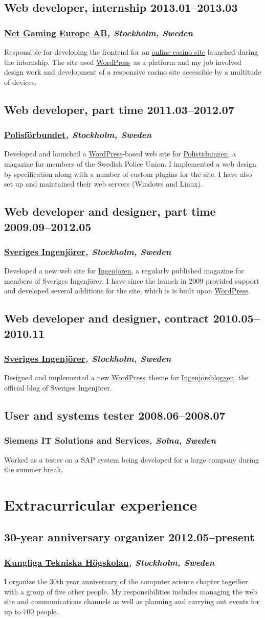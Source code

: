 \documentclass[a4paper,11pt]{article}
\newcommand{\thework}[2]{
  \subsection*{\textbf{#1} \hfill \textbf{#2}}\par%
}
\newcommand{\theplace}[2][]{%
  \subsubsection*{\textbf{#2}\textsl{#1}}%
}
\def\wordpress{\href{http://wordpress.org}{WordPress}}
\begin{document}
\thework{Web developer, internship}{2013.01--2013.03}
\theplace[, Stockholm, Sweden]{\href{http://www.netgaming.se}{Net Gaming Europe AB}}
Responsible for developing the frontend for an \href{http://casinoloco.com}{online casino site} launched during the internship. The site used \wordpress\ as a platform and my job involved design work and development of a responsive casino site accessible by a multitude of devices.

\thework{Web developer, part time}{2011.03--2012.07}
\theplace[, Stockholm, Sweden]{\href{http://www.polisforbundet.se}{Polisförbundet}}
Developed and launched a \wordpress-based web site for \href{http://www.polistidningen.se}{Polistidningen}, a magazine for members of the \mbox{Swedish} Police Union. I implemented a web design by specification along with a number of custom plugins for the site. I have also set up and maintained their web servers (Windows and Linux).

\thework{Web developer and designer, part time}{2009.09--2012.05}
\theplace[, Stockholm, Sweden]{\href{http://www.sverigesingenjorer.se}{Sveriges Ingenjörer}}
Developed a new web site for \href{http://www.ingenjoren.se}{Ingenjören}, a regularly published magazine for members of Sveriges Ingenjörer. I have since the launch in 2009 provided support and developed several additions for the site, which is is built upon \wordpress.

\thework{Web developer and designer, contract}{2010.05--2010.11}
\theplace[, Stockholm, Sweden]{\href{http://www.sverigesingenjorer.se}{Sveriges Ingenjörer}}
Designed and implemented a new \wordpress\ theme for \href{http://www.ingenjorsbloggen.se}{Ingenjörsbloggen}, the official blog of Sveriges Ingenjörer.

\thework{User and systems tester}{2008.06--2008.07}
\theplace[, Solna, Sweden]{Siemens IT Solutions and Services}
Worked as a tester on a SAP system being developed for a large company during the summer break.

\section*{Extracurricular experience}%

\thework{30-year anniversary organizer}{2012.05--present}
\theplace[, Stockholm, Sweden]{\href{http://kth.se}{Kungliga Tekniska Högskolan}}
I organize the \href{http://djubileet.se/}{30th year anniversary} of the computer science chapter together with a group of five other people. My responsibilities includes managing the web site and communications channels as well as planning and carrying out events for up to 700 people.
\end{document}
